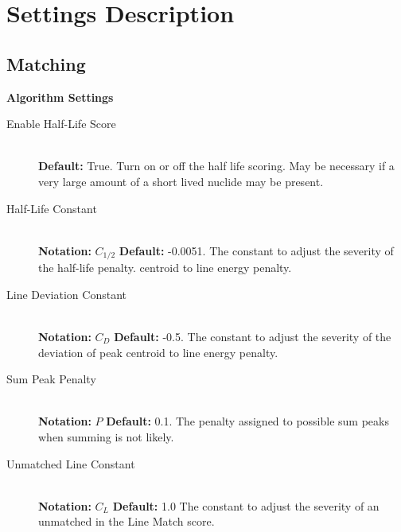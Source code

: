 \documentclass[12pt,report,justified]{SANDreport}
\begin{document}
    \nocite{*}

    
    


    \appendix
    \chapter{Settings Description}\label{sec:set_desc}

\section{Matching}
\begin{center}
{\large \textbf{Algorithm Settings}}
\end{center}
\begin{description}
\item[Enable Half-Life Score]\label{itm:hl_score} \hfill \\
\textbf{Default:} True. Turn on or off the half life scoring. May be necessary if a very large amount
of a short lived nuclide may be present.
\item[Half-Life Constant]\label{itm:hl_const} \hfill \\
\textbf{Notation:} \( C_{1/2}\) \textbf{Default:} -0.0051. The constant to adjust the severity of the half-life penalty.
centroid to line energy penalty.
\item[Line Deviation Constant]\label{itm:ln_dev_const} \hfill \\
\textbf{Notation:} \( C_D\) \textbf{Default:} -0.5. The constant to adjust the severity of the deviation of peak
centroid to line energy penalty.
\item[Sum Peak Penalty]\label{itm:sm_peak_pen} \hfill \\
\textbf{Notation:} \( P\) \textbf{Default:} 0.1. The penalty assigned to possible sum peaks when summing is
not likely.
\item[Unmatched Line Constant]\label{itm:um_line_const} \hfill \\
\textbf{Notation:} \( C_L\) \textbf{Default:} 1.0 The constant to adjust the severity of an unmatched in the Line Match score.
\end{description}
\end{document}
